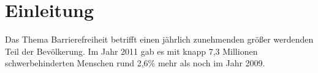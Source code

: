 %
\chapter{Einleitung}
\label{sec:Einleitung}





Das Thema Barrierefreiheit betrifft einen jährlich zunehmenden größer werdenden Teil der Bevölkerung. Im Jahr 2011 gab es mit knapp 7,3 Millionen schwerbehinderten Menschen rund 2,6\% mehr als noch im Jahr 2009.\cite[]{WEB:DESTATIS:2014}
